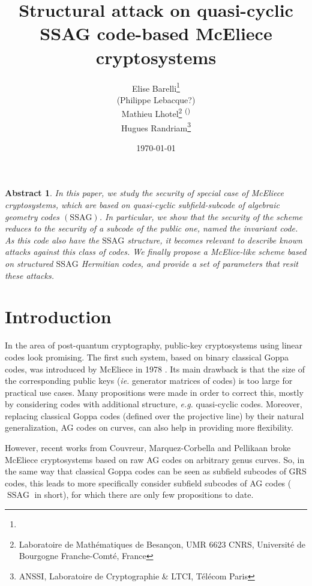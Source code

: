 \documentclass[10pt]{article}
\title{Structural attack on quasi-cyclic SSAG code-based McEliece cryptosystems}
\author{
Elise Barelli\footnote{}\\
(Philippe Lebacque?)\\
Mathieu Lhotel\footnote{Laboratoire de Mathématiques de Besançon, UMR 6623 CNRS, Université de Bourgogne Franche-Comté, France} \textsuperscript{(\Letter)}\\
Hugues Randriam\footnote{ANSSI, Laboratoire de Cryptographie \& LTCI, Télécom Paris}
}
\date{\today}
\newtheorem*{abs}{Abstract}
\theoremstyle{definition}
\theoremstyle{definition}
\theoremstyle{definition}
\newcommand{\ssag}{\operatorname{SSAG}}
\begin{document}
\maketitle

\begin{abs} 
In this paper, we study the security of special case of McEliece cryptosystems, which are based on quasi-cyclic subfield-subcode of algebraic geometry codes $(\mathrm{SSAG})$. In particular, we show that the security of the scheme reduces to the security of a subcode of the public one, named the invariant code. As this code also have the $\mathrm{SSAG}$ structure, it becomes relevant to describe known attacks against this class of codes. We finally propose a McElice-like scheme based on structured $\mathrm{SSAG}$ Hermitian codes, and provide a set of parameters that resit these attacks.
\end{abs}

\newpage


\section{Introduction}


In the area of post-quantum cryptography, public-key cryptosystems using linear codes look promising. The first such system, based on binary classical Goppa codes, was introduced by McEliece in 1978 \cite{McE}. Its main drawback is that the size of the corresponding public keys (\textit{ie.} generator matrices of codes) is too large for practical use cases. Many propositions were made in order to correct this, mostly by considering codes with additional structure, \textit{e.g.} quasi-cyclic codes. Moreover, replacing classical Goppa codes (defined over the projective line) by their natural generalization, AG codes on curves, can also help in providing more flexibility. 

\vspace*{0.2cm}

\noindent However, recent works from Couvreur, Marquez-Corbella and Pellikaan \cite{CMP} broke McEliece cryptosystems based on raw AG codes on arbitrary genus curves. So, in the same way that classical Goppa codes can be seen as subfield subcodes of GRS codes, this leads to more specifically consider subfield subcodes of AG codes ($\ssag$ in short), for which there are only few propositions to date. 

\vspace*{0.2cm}
\end{document}
